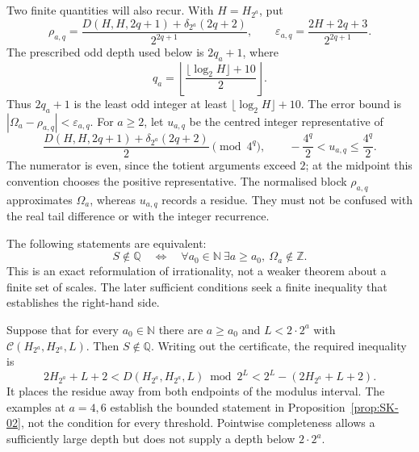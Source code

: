 Two finite quantities will also recur. With $H=H_{2^a}$, put
\[
 \rho_{a,q}=\frac{D(H,H,2q+1)+\delta_{2^a}(2q+2)}{2^{2q+1}},
 \qquad \varepsilon_{a,q}=\frac{2H+2q+3}{2^{2q+1}}.
\]
The prescribed odd depth used below is $2q_a+1$, where
\[
 q_a=\left\lfloor\frac{\lfloor\log_2 H\rfloor+10}{2}\right\rfloor.
\]
Thus $2q_a+1$ is the least odd integer at least
$\lfloor\log_2 H\rfloor+10$. The error bound is
$|\Omega_a-\rho_{a,q}|<\varepsilon_{a,q}$.
For $a\ge2$, let $u_{a,q}$ be the centred integer representative of
\[
 \frac{D(H,H,2q+1)+\delta_{2^a}(2q+2)}2\pmod{4^q},
 \qquad -\frac{4^q}2<u_{a,q}\le\frac{4^q}2.
\]
The numerator is even, since the totient arguments exceed $2$; at the
midpoint this convention chooses the positive representative. The
normalised block $\rho_{a,q}$ approximates $\Omega_a$, whereas
$u_{a,q}$ records a residue. They must not be confused with the real
tail difference or with the integer recurrence.

\begin{prop}\label{prop:NI-01}
The following statements are equivalent:
\[
 S\notin\mathbb Q
 \quad\Longleftrightarrow\quad
 \forall a_0\in\mathbb N\ \exists a\ge a_0,\ \Omega_a\notin\mathbb Z.
\]
This is an exact reformulation of irrationality, not a weaker theorem
about a finite set of scales. The later sufficient conditions seek a
finite inequality that establishes the right-hand side.
\end{prop}

\begin{prop}\label{prop:AR-07}
Suppose that for every $a_0\in\mathbb N$ there are $a\ge a_0$
and $L<2\cdot2^a$ with $\mathcal C(H_{2^a},H_{2^a},L)$. Then
$S\notin\mathbb Q$. Writing out the certificate, the required inequality is
\[
 2H_{2^a}+L+2
 <D(H_{2^a},H_{2^a},L)\bmod2^L
 <2^L-(2H_{2^a}+L+2).
\]
It places the residue away from both endpoints of the modulus interval.
The examples at $a=4,6$ establish the bounded statement in
Proposition~\ref{prop:SK-02}, not the condition for every threshold.
Pointwise completeness allows a sufficiently large depth but does not
supply a depth below $2\cdot2^a$.

\end{prop}

